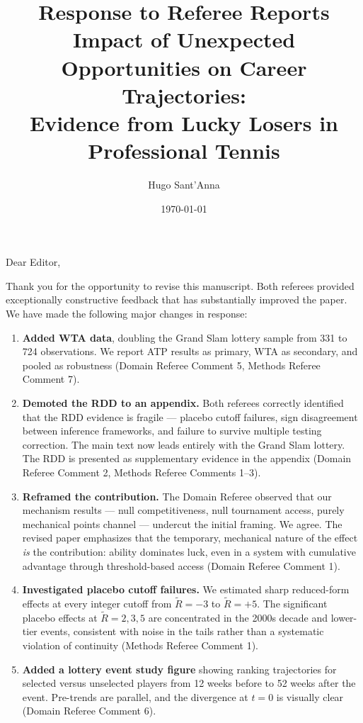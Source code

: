 \documentclass[12pt]{article}
\title{Response to Referee Reports\\[0.5em]
\large Impact of Unexpected Opportunities on Career Trajectories:\\
Evidence from Lucky Losers in Professional Tennis}
\author{Hugo Sant'Anna}
\date{\today}
\begin{document}
\maketitle
\singlespacing

\noindent Dear Editor,

Thank you for the opportunity to revise this manuscript. Both referees provided exceptionally constructive feedback that has substantially improved the paper. We have made the following major changes in response:

\begin{enumerate}
\item \textbf{Added WTA data}, doubling the Grand Slam lottery sample from 331 to 724 observations. We report ATP results as primary, WTA as secondary, and pooled as robustness (Domain Referee Comment 5, Methods Referee Comment 7).

\item \textbf{Demoted the RDD to an appendix.} Both referees correctly identified that the RDD evidence is fragile --- placebo cutoff failures, sign disagreement between inference frameworks, and failure to survive multiple testing correction. The main text now leads entirely with the Grand Slam lottery. The RDD is presented as supplementary evidence in the appendix (Domain Referee Comment 2, Methods Referee Comments 1--3).

\item \textbf{Reframed the contribution.} The Domain Referee observed that our mechanism results --- null competitiveness, null tournament access, purely mechanical points channel --- undercut the initial framing. We agree. The revised paper emphasizes that the temporary, mechanical nature of the effect \textit{is} the contribution: ability dominates luck, even in a system with cumulative advantage through threshold-based access (Domain Referee Comment 1).

\item \textbf{Investigated placebo cutoff failures.} We estimated sharp reduced-form effects at every integer cutoff from $\tilde{R} = -3$ to $\tilde{R} = +5$. The significant placebo effects at $\tilde{R} = 2, 3, 5$ are concentrated in the 2000s decade and lower-tier events, consistent with noise in the tails rather than a systematic violation of continuity (Methods Referee Comment 1).

\item \textbf{Added a lottery event study figure} showing ranking trajectories for selected versus unselected players from 12 weeks before to 52 weeks after the event. Pre-trends are parallel, and the divergence at $t = 0$ is visually clear (Domain Referee Comment 6).


\end{enumerate}
\end{document}
